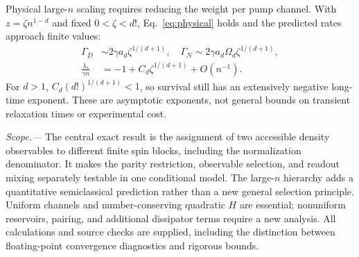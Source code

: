 \documentclass[aps,pra,reprint,superscriptaddress,nofootinbib]{revtex4-2}
\begin{document}
Physical large-$n$ scaling requires reducing the weight per pump channel. With $z=\zeta n^{1-d}$ and fixed $0<\zeta<d!$, Eq.~\eqref{eq:physical} holds and the predicted rates approach finite values:
\begin{align}
\Gamma_D&\sim2\gamma a_d\zeta^{1/(d+1)},\quad
\Gamma_N\sim2\gamma a_d\Omega_d\zeta^{1/(d+1)},\nonumber\\
\frac{\lambda_*}{\gamma n}&=-1+C_d\zeta^{1/(d+1)}+O(n^{-1}).
\label{eq:physicalscaling}
\end{align}
For $d>1$, $C_d(d!)^{1/(d+1)}<1$, so survival still has an extensively negative long-time exponent. These are asymptotic exponents, not general bounds on transient relaxation times or experimental cost.

\emph{Scope.---}
The central exact result is the assignment of two accessible density observables to different finite spin blocks, including the normalization denominator. It makes the parity restriction, observable selection, and readout mixing separately testable in one conditional model. The large-$n$ hierarchy adds a quantitative semiclassical prediction rather than a new general selection principle. Uniform channels and number-conserving quadratic $H$ are essential; nonuniform reservoirs, pairing, and additional dissipator terms require a new analysis. All calculations and source checks are supplied, including the distinction between floating-point convergence diagnostics and rigorous bounds.


\end{document}
